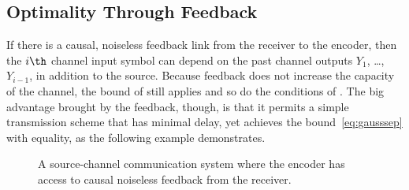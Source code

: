 \subsection{Optimality Through Feedback}

If there is a causal, noiseless feedback link from the receiver to the encoder,
then the $i\th$ channel input symbol can depend on the past channel outputs
$Y_1$, \dots, $Y_{i-1}$, in addition to the source. Because feedback does not
increase the capacity of the channel, the bound of 
still applies and so do the conditions of . The big
advantage brought by the feedback, though, is that it permits a simple
transmission scheme that has minimal delay, yet achieves the
bound~\eqref{eq:gausssep} with equality, as the following example demonstrates.

\begin{figure}
  \begin{center}
    
  \end{center}
  \caption{A source-channel communication system where the encoder has access to
  causal noiseless feedback from the receiver.}
  \label{fig:scgenfeedback}
\end{figure}

